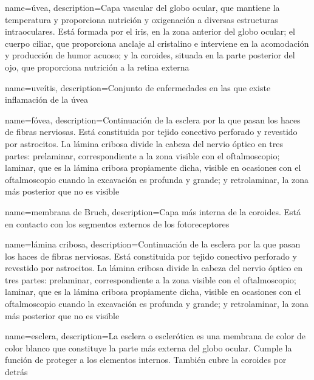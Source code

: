 {
  name={úvea},
  description={Capa vascular del globo ocular, que mantiene la
    temperatura y proporciona nutrición y oxigenación a diversas
    estructuras intraoculares. Está formada por el iris, en la zona
    anterior del globo ocular; el cuerpo ciliar, que proporciona
    anclaje al cristalino e interviene en la acomodación y producción
    de humor acuoso; y la coroides, situada en la parte posterior del
    ojo, que proporciona nutrición a la retina externa}
}

{
  name={uveítis},
  description={Conjunto de enfermedades en las que existe inflamación de la úvea}
}

{
  name={fóvea},
  description={Continuación de la esclera por la que pasan los haces
    de fibras nerviosas. Está constituida por tejido conectivo
    perforado y revestido por astrocitos. La lámina cribosa divide la
    cabeza del nervio óptico en tres partes: prelaminar,
    correspondiente a la zona visible con el oftalmoscopio; laminar,
    que es la lámina cribosa propiamente dicha, visible en ocasiones con
    el oftalmoscopio cuando la excavación es profunda y grande; y
    retrolaminar, la zona más posterior que no es visible}
}

{
  name={membrana de Bruch},
  description={Capa más interna de la coroides. Está en contacto con los
    segmentos externos de los fotoreceptores}
}

{
  name={lámina cribosa},
  description={Continuación de la esclera por la que pasan los haces
    de fibras nerviosas. Está constituida por tejido conectivo
    perforado y revestido por astrocitos. La lámina cribosa divide la
    cabeza del nervio óptico en tres partes: prelaminar,
    correspondiente a la zona visible con el oftalmoscopio; laminar,
    que es la lámina cribosa propiamente dicha, visible en ocasiones con
    el oftalmoscopio cuando la excavación es profunda y grande; y
    retrolaminar, la zona más posterior que no es visible}
}

{
  name={esclera},
  description={La esclera o esclerótica es una membrana de color de 
    color blanco que constituye la parte más externa del globo ocular.
    Cumple la función de proteger a los elementos internos. También
    cubre la coroides por detrás}
}